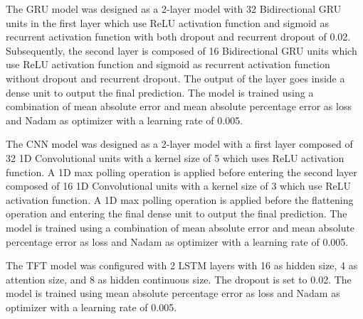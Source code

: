 The GRU model was designed as a 2-layer model with 32 Bidirectional GRU units in the first layer which use ReLU activation function and sigmoid as recurrent activation function with both dropout and recurrent dropout of 0.02.
Subsequently, the second layer is composed of 16 Bidirectional GRU units which use ReLU activation function and sigmoid as recurrent activation function without dropout and recurrent dropout.
The output of the layer goes inside a dense unit to output the final prediction.
The model is trained using a combination of mean absolute error and mean absolute percentage error as loss and Nadam as optimizer with a learning rate of 0.005.

The CNN model was designed as a 2-layer model with a first layer composed of 32 1D Convolutional units with a kernel size of 5 which uses ReLU activation function.
A 1D max polling operation is applied before entering the second layer composed of 16 1D Convolutional units with a kernel size of 3 which use ReLU activation function.
A 1D max polling operation is applied before the flattening operation and entering the final dense unit to output the final prediction.
The model is trained using a combination of mean absolute error and mean absolute percentage error as loss and Nadam as optimizer with a learning rate of 0.005.

The TFT model was configured with 2 LSTM layers with 16 as hidden size, 4 as attention size, and 8 as hidden continuous size.
The dropout is set to 0.02.
The model is trained using mean absolute percentage error as loss and Nadam as optimizer with a learning rate of 0.005.

